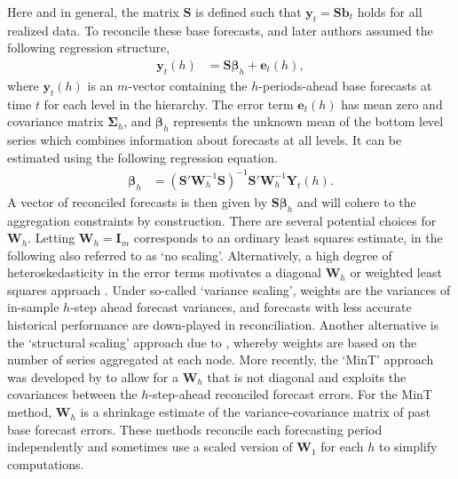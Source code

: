 \documentclass[a4paper,fleqn,11pt]{article}
\begin{document}
Here and in general, the matrix $\textbf{S}$ is defined such that $\textbf{y}_t = \textbf{S} \textbf{b}_{t}$ holds for all realized data. To reconcile these base forecasts, \cite{Hyndman2011} and later authors assumed the following regression structure,
\begin{align}
\textbf{y}_t(h) &= \textbf{S} \boldsymbol{\beta}_{h} + \textbf{e}_t(h),
\label{eq:regstruct}
\end{align}
where $\textbf{y}_t(h)$ is an $m$-vector containing the $h$-periods-ahead base forecasts at time $t$ for each level in the hierarchy. The error term $\textbf{e}_t(h)$ has mean zero and covariance matrix $\boldsymbol{\Sigma}_h$, and $\boldsymbol{\beta}_{h}$ represents the unknown mean of the bottom level series which combines information about forecasts at all levels. It can be estimated using the following regression equation.
\begin{align}
\label{eq:reg}
\boldsymbol{\beta}_{h} &= \left(\textbf{S}'\textbf{W}_h^{-1}\textbf{S} \right)^{-1} \textbf{S}'\textbf{W}_h^{-1}\textbf{Y}_t(h).
\end{align}
A vector of reconciled forecasts is then given by $\textbf{S} \boldsymbol{\beta}_{h}$ and will cohere to the aggregation constraints by construction. There are several potential choices for $\textbf{W}_h$. Letting $\textbf{W}_h = \textbf{I}_m$ corresponds to an ordinary least squares estimate, in the following also referred to as `no scaling'. Alternatively, a high degree of heteroskedasticity in the error terms motivates a diagonal $\textbf{W}_h$ or weighted least squares approach \citep{Hyndman2016}. Under so-called `variance scaling', weights are the variances of in-sample $h$-step ahead forecast variances, and forecasts with less accurate historical performance are down-played in reconciliation. Another alternative is the `structural scaling' approach due to \cite{Athanasopoulos2017}, whereby weights are based on the number of series aggregated at each node. More recently, the `MinT' approach was developed by \cite{Wickramasuriya2015} to allow for a $\textbf{W}_h$ that is not diagonal and exploits the covariances between the $h$-step-ahead reconciled forecast errors. For the MinT method, $\textbf{W}_h$ is a shrinkage estimate of the variance-covariance matrix of past base forecast errors. These methods reconcile each forecasting period independently and sometimes use a scaled version of $\textbf{W}_1$ for each $h$ to simplify computations. 
\end{document}
